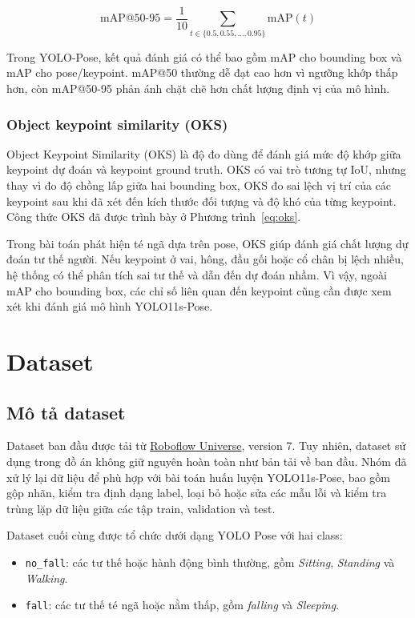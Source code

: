 \documentclass[12pt, a4paper]{article}
\begin{document}
\begin{equation}
  \text{mAP@50-95} = \frac{1}{10} \sum_{t \in \{0.5, 0.55,\ldots, 0.95\}} \text{mAP}(t)
\end{equation}

Trong YOLO-Pose, kết quả đánh giá có thể bao gồm mAP cho bounding box và mAP cho pose/keypoint.
mAP@50 thường dễ đạt cao hơn vì ngưỡng khớp thấp hơn, còn mAP@50-95 phản ánh chặt chẽ hơn chất lượng định vị của mô hình.

\subsubsection{Object keypoint similarity (OKS)}
Object Keypoint Similarity (OKS) là độ đo dùng để đánh giá mức độ khớp giữa keypoint dự đoán và keypoint ground truth.
OKS có vai trò tương tự IoU, nhưng thay vì đo độ chồng lấp giữa hai bounding box, OKS đo sai lệch vị trí của các keypoint sau khi đã xét đến kích thước đối tượng và độ khó của từng keypoint.
Công thức OKS đã được trình bày ở Phương trình~\ref{eq:oks}.

Trong bài toán phát hiện té ngã dựa trên pose, OKS giúp đánh giá chất lượng dự đoán tư thế người.
Nếu keypoint ở vai, hông, đầu gối hoặc cổ chân bị lệch nhiều, hệ thống có thể phân tích sai tư thế và dẫn đến dự đoán nhầm.
Vì vậy, ngoài mAP cho bounding box, các chỉ số liên quan đến keypoint cũng cần được xem xét khi đánh giá mô hình YOLO11s-Pose.

\section{Dataset}
\label{sec:dataset}

\subsection{Mô tả dataset}
Dataset ban đầu được tải từ \href{https://universe.roboflow.com/freelance-v0zzk/fall-detection-hxwtc}{Roboflow Universe}, version 7.
Tuy nhiên, dataset sử dụng trong đồ án không giữ nguyên hoàn toàn như bản tải về ban đầu.
Nhóm đã xử lý lại dữ liệu để phù hợp với bài toán huấn luyện YOLO11s-Pose, bao gồm gộp nhãn, kiểm tra định dạng label, loại bỏ hoặc sửa các mẫu lỗi và kiểm tra trùng lặp dữ liệu giữa các tập train, validation và test.

Dataset cuối cùng được tổ chức dưới dạng YOLO Pose với hai class:
\begin{itemize}[nosep]
  \item \texttt{no\_fall}: các tư thế hoặc hành động bình thường, gồm \textit{Sitting}, \textit{Standing} và \textit{Walking}.
  \item \texttt{fall}: các tư thế té ngã hoặc nằm thấp, gồm \textit{falling} và \textit{Sleeping}.
\end{itemize}
\end{document}
